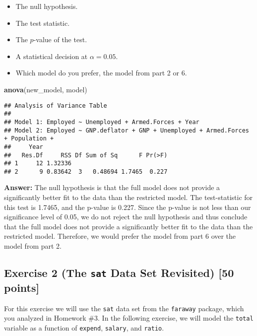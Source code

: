 \documentclass[
]{article}
\newenvironment{Shaded}{\begin{snugshade}}{\end{snugshade}}
\newcommand{\FunctionTok}[1]{\textcolor[rgb]{0.13,0.29,0.53}{\textbf{#1}}}
\newcommand{\NormalTok}[1]{#1}
\providecommand{\tightlist}{%
  \setlength{\itemsep}{0pt}\setlength{\parskip}{0pt}}
\begin{document}
\begin{enumerate}
  \begin{itemize}
  \tightlist
  \item
    The null hypothesis.
  \item
    The test statistic.
  \item
    The \(p\)-value of the test.
  \item
    A statistical decision at \(\alpha = 0.05\).
  \item
    Which model do you prefer, the model from part 2 or 6.
  \end{itemize}

\begin{Shaded}
\begin{Highlighting}[]
\FunctionTok{anova}\NormalTok{(new\_model, model)}
\end{Highlighting}
\end{Shaded}

\begin{verbatim}
## Analysis of Variance Table
## 
## Model 1: Employed ~ Unemployed + Armed.Forces + Year
## Model 2: Employed ~ GNP.deflator + GNP + Unemployed + Armed.Forces + Population + 
##     Year
##   Res.Df     RSS Df Sum of Sq      F Pr(>F)
## 1     12 1.32336                           
## 2      9 0.83642  3   0.48694 1.7465  0.227
\end{verbatim}

  \textbf{Answer:} The null hypothesis is that the full model does not
  provide a significantly better fit to the data than the restricted
  model. The test-statistic for this test is 1.7465, and the p-value is
  0.227. Since the p-value is not less than our significance level of
  0.05, we do not reject the null hypothesis and thus conclude that the
  full model does not provide a significantly better fit to the data
  than the restricted model. Therefore, we would prefer the model from
  part 6 over the model from part 2.
\end{enumerate}

\hypertarget{exercise-2-the-sat-data-set-revisited-50-points}{%
\subsection{\texorpdfstring{Exercise 2 (The \texttt{sat} Data Set
Revisited) {[}50
points{]}}{Exercise 2 (The sat Data Set Revisited) {[}50 points{]}}}\label{exercise-2-the-sat-data-set-revisited-50-points}}

For this exercise we will use the \texttt{sat} data set from the
\texttt{faraway} package, which you analyzed in Homework \#3. In the
following exercise, we will model the \texttt{total} variable as a
function of \texttt{expend}, \texttt{salary}, and \texttt{ratio}.
\end{document}
